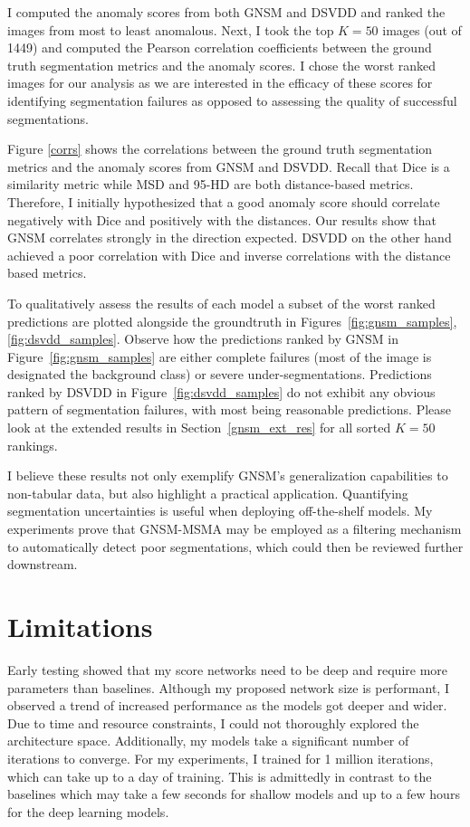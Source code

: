 I computed the anomaly scores from both GNSM and DSVDD and ranked the images from most to least anomalous. Next, I took the top $K=50$ images (out of 1449) and computed the  Pearson correlation coefficients between the ground truth segmentation metrics and the anomaly scores. I chose the worst ranked images for our analysis as we are interested in the efficacy of these scores for identifying segmentation failures as opposed to assessing the quality of successful segmentations.

Figure \ref{corrs} shows the correlations between the ground truth segmentation metrics and the anomaly scores from GNSM and DSVDD.  Recall that Dice is a similarity metric while MSD and 95-HD are both distance-based metrics. Therefore, I initially hypothesized that a good anomaly score should correlate negatively with Dice and positively with the distances. Our results show that GNSM correlates strongly in the direction expected. DSVDD on the other hand achieved a poor correlation with Dice and inverse correlations with the distance based metrics.

To qualitatively assess the results of each model a subset of the worst ranked predictions are plotted alongside the groundtruth in Figures~\ref{fig:gnsm_samples},\ref{fig:dsvdd_samples}. Observe how the predictions ranked by GNSM in Figure~\ref{fig:gnsm_samples} are either complete failures (most of the image is designated the background class) or severe under-segmentations. Predictions ranked by DSVDD in Figure~\ref{fig:dsvdd_samples} do not exhibit any obvious pattern of segmentation failures, with most being reasonable predictions. Please look at the extended results in Section~\ref{gnsm_ext_res} for all sorted $K=50$ rankings. 


I believe these results not only exemplify GNSM’s generalization capabilities to non-tabular data, but also highlight a practical application. Quantifying segmentation uncertainties is useful when deploying off-the-shelf models. My experiments prove that GNSM-MSMA may be employed as a filtering mechanism to automatically detect poor segmentations, which could then be reviewed further downstream.

\section{Limitations}

Early testing showed that my score networks need to be deep and require more parameters than baselines. Although my proposed network size is performant, I observed a trend of increased performance as the models got deeper and wider. Due to time and resource constraints, I could not thoroughly explored the architecture space. Additionally, my models take a significant number of iterations to converge. For my experiments, I trained for 1 million iterations, which can take up to a day of training. This is admittedly in contrast to the baselines which may take a few seconds for shallow models and up to a few hours for the deep learning models.

